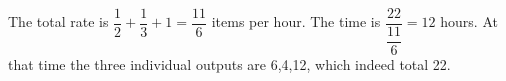 The total rate is $\dfrac{1}{2}+\dfrac{1}{3}+1=\dfrac{11}{6}$ items per hour. The time is $\dfrac{22}{\dfrac{11}{6}}=\boxed{12}$ hours. At that time the three individual outputs are 6,4,12, which indeed total 22.
